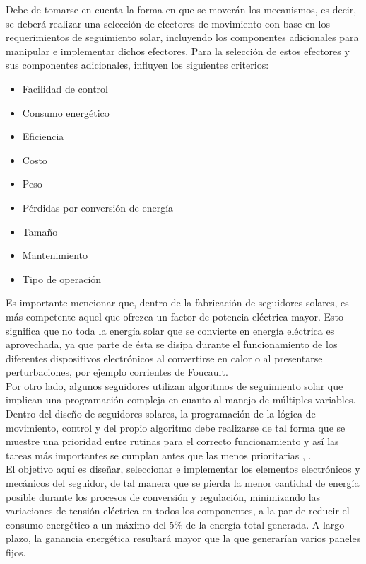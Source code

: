 Debe de tomarse en cuenta la forma en que se moverán los mecanismos, es decir, se deberá realizar una selección de efectores de movimiento con base en los requerimientos de seguimiento solar, incluyendo los componentes adicionales para manipular e implementar dichos efectores. Para la selección de estos efectores y sus componentes adicionales, influyen los siguientes criterios:

\begin{multicols}{2}
	\begin{itemize}
		\item Facilidad de control
		\item Consumo energético
		\item Eficiencia
		\item Costo
		\item Peso
		\item Pérdidas por conversión de energía
		\item Tamaño
		\item Mantenimiento
		\item Tipo de operación
	\end{itemize}
\end{multicols}

Es importante mencionar que, dentro de la fabricación de seguidores solares, es más competente aquel que ofrezca un factor de potencia eléctrica mayor. Esto significa que no toda la energía solar que se convierte en energía eléctrica es aprovechada, ya que parte de ésta se disipa durante el funcionamiento de los diferentes dispositivos electrónicos al convertirse en calor o al presentarse perturbaciones, por ejemplo corrientes de Foucault.\\

\newpage
Por otro lado, algunos seguidores utilizan algoritmos de seguimiento solar que implican una programación compleja en cuanto al manejo de múltiples variables. Dentro del diseño de seguidores solares, la programación de la lógica de movimiento, control y del propio algoritmo debe realizarse de tal forma que se muestre una prioridad entre rutinas para el correcto funcionamiento y así las tareas más importantes se cumplan antes que las menos prioritarias \cite{I10}, \cite{I11}.\\

El objetivo aquí es diseñar, seleccionar e implementar los elementos electrónicos y mecánicos del seguidor, de tal manera que se pierda la menor cantidad de energía posible durante los procesos de conversión y regulación, minimizando las variaciones de tensión eléctrica en todos los componentes, a la par de reducir el consumo energético a un máximo del 5\% de la energía total generada. A largo plazo, la ganancia energética resultará mayor que la que generarían varios paneles fijos.\\


